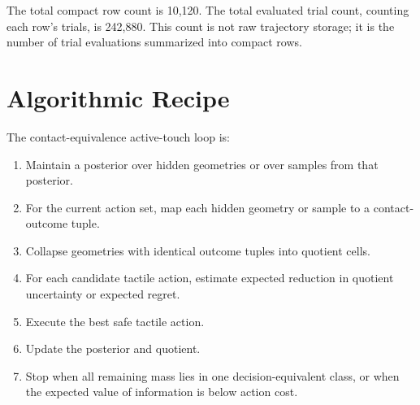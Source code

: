 \documentclass{article}
\begin{document}
\begin{table}[h]
\centering
\caption{Full-scale artifact inventory.}
\label{tab:inventory}
\end{table}

The total compact row count is 10,120. The total evaluated trial count, counting each row's trials, is 242,880. This count is not raw trajectory storage; it is the number of trial evaluations summarized into compact rows.

\section{Algorithmic Recipe}

The contact-equivalence active-touch loop is:

\begin{enumerate}
    \item Maintain a posterior over hidden geometries or over samples from that posterior.
    \item For the current action set, map each hidden geometry or sample to a contact-outcome tuple.
    \item Collapse geometries with identical outcome tuples into quotient cells.
    \item For each candidate tactile action, estimate expected reduction in quotient uncertainty or expected regret.
    \item Execute the best safe tactile action.
    \item Update the posterior and quotient.
    \item Stop when all remaining mass lies in one decision-equivalent class, or when the expected value of information is below action cost.
\end{enumerate}
\end{document}

